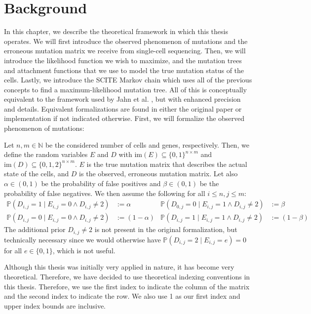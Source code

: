 \chapter{Background}
\label{ch:background}

In this chapter, we describe the theoretical framework in which this thesis operates. We will first introduce the observed phenomenon of mutations and the erroneous mutation matrix we receive from single-cell sequencing. Then, we will introduce the likelihood function we wish to maximize, and the mutation trees and attachment functions that we use to model the true mutation status of the cells. Lastly, we introduce the \ac{SCITE} Markov chain which uses all of the previous concepts to find a maximum-likelihood mutation tree. All of this is conceptually equivalent to the framework used by Jahn et al. \cite{tree2016}, but with enhanced precision and details. Equivalent formalizations are found in either the original paper or implementation if not indicated otherwise. First, we will formalize the observed phenomenon of mutations:

\begin{definition}
    \label{def:mutmatrix}
    Let $n, m \in \mathbb{N}$ be the considered number of cells and genes, respectively. Then, we define the random variables $E$ and $D$ with $\mathrm{im}(E) \subseteq \{0,1\}^{n \times m}$ and $\mathrm{im}(D) \subseteq \{0, 1, 2\}^{n \times m}$. $E$ is the true mutation matrix that describes the actual state of the cells, and $D$ is the observed, erroneous mutation matrix. Let also $\alpha \in (0,1)$ be the probability of false positives and $\beta \in (0,1)$ be the probability of false negatives. We then assume the following for all $i \leq n, j \leq m$:
    \begin{align*}
        \mathbb{P}(D_{i,j} = 1 \mid E_{i,j} = 0 \wedge D_{i,j} \neq 2) &:= \alpha & \mathbb{P}(D_{0,j} = 0\mid E_{i,j} = 1 \wedge D_{i,j} \neq 2) &:= \beta \\
        \mathbb{P}(D_{i,j} = 0 \mid E_{i,j} = 0 \wedge D_{i,j} \neq 2) &:= (1-\alpha) & \mathbb{P}(D_{i,j} = 1 \mid E_{i,j} = 1 \wedge D_{i,j} \neq 2) &:= (1-\beta)
    \end{align*}
    The additional prior $D_{i,j} \neq 2$ is not present in the original formalization, but technically necessary since we would otherwise have $\mathbb{P}(D_{i,j} = 2 \mid E_{i,j} = e) = 0$ for all $e \in \{0,1\}$, which is not useful.
    
    Although this thesis was initially very applied in nature, it has become very theoretical. Therefore, we have decided to use theoretical indexing conventions in this thesis. Therefore, we use the first index to indicate the column of the matrix and the second index to indicate the row. We also use 1 as our first index and upper index bounds are inclusive.
\end{definition}

